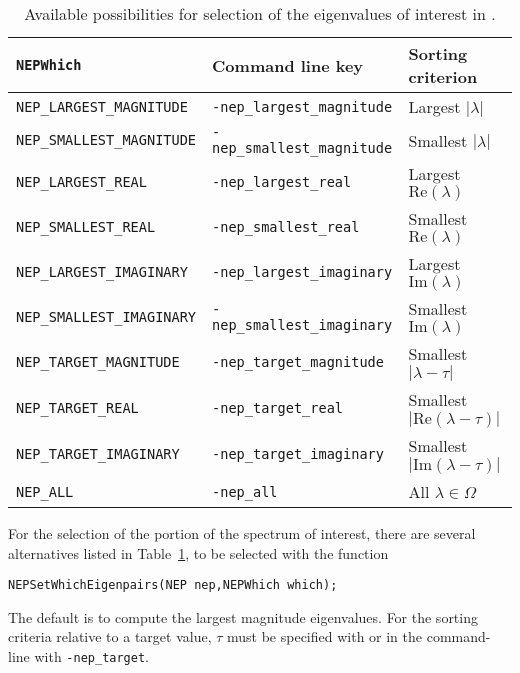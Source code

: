 \begin{table}
\centering
{\small \begin{tabular}{lll}
\texttt{NEPWhich}                  & Command line key                   & Sorting criterion \\\hline
\texttt{NEP\_LARGEST\_MAGNITUDE}   & \texttt{-nep\_largest\_magnitude}  & Largest $|\lambda|$ \\
\texttt{NEP\_SMALLEST\_MAGNITUDE}  & \texttt{-nep\_smallest\_magnitude} & Smallest $|\lambda|$ \\
\texttt{NEP\_LARGEST\_REAL}        & \texttt{-nep\_largest\_real}       & Largest $\mathrm{Re}(\lambda)$ \\
\texttt{NEP\_SMALLEST\_REAL}       & \texttt{-nep\_smallest\_real}      & Smallest $\mathrm{Re}(\lambda)$ \\
\texttt{NEP\_LARGEST\_IMAGINARY}   & \texttt{-nep\_largest\_imaginary}  & Largest $\mathrm{Im}(\lambda)$ \\
\texttt{NEP\_SMALLEST\_IMAGINARY}  & \texttt{-nep\_smallest\_imaginary} & Smallest $\mathrm{Im}(\lambda)$ \\\hline
\texttt{NEP\_TARGET\_MAGNITUDE}    & \texttt{-nep\_target\_magnitude}   & Smallest $|\lambda-\tau|$ \\
\texttt{NEP\_TARGET\_REAL}         & \texttt{-nep\_target\_real}        & Smallest $|\mathrm{Re}(\lambda-\tau)|$ \\
\texttt{NEP\_TARGET\_IMAGINARY}    & \texttt{-nep\_target\_imaginary}   & Smallest $|\mathrm{Im}(\lambda-\tau)|$ \\
\texttt{NEP\_ALL}                  & \texttt{-nep\_all}                 & All $\lambda\in\Omega$\\\hline
\end{tabular} }
\caption{\label{tab:portionn}Available possibilities for selection of the eigenvalues of interest in .}
\end{table}

	For the selection of the portion of the spectrum of interest, there are several alternatives listed in Table~\ref{tab:portionn}, to be selected with the function
	\begin{Verbatim}[fontsize=\small]
	NEPSetWhichEigenpairs(NEP nep,NEPWhich which);
	\end{Verbatim}
The default is to compute the largest magnitude eigenvalues.
For the sorting criteria relative to a target value, $\tau$ must be specified with  or in the command-line with \Verb!-nep_target!.

